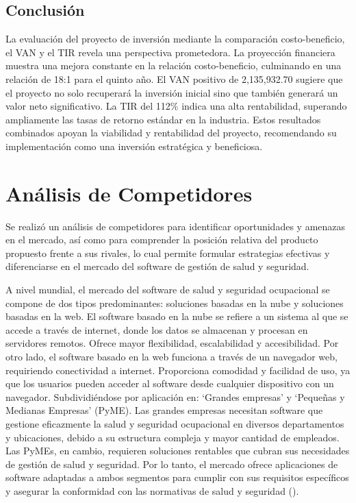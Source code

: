 \subsection{Conclusión}
La evaluación del proyecto de inversión mediante la comparación costo-beneficio, el VAN y el TIR revela una perspectiva prometedora. La proyección financiera muestra una mejora constante en la relación costo-beneficio, culminando en una relación de 18:1 para el quinto año. El VAN positivo de 2,135,932.70 sugiere que el proyecto no solo recuperará la inversión inicial sino que también generará un valor neto significativo. La TIR del 112\% indica una alta rentabilidad, superando ampliamente las tasas de retorno estándar en la industria. Estos resultados combinados apoyan la viabilidad y rentabilidad del proyecto, recomendando su implementación como una inversión estratégica y beneficiosa.

\section{Análisis de Competidores}

Se realizó un análisis de competidores para identificar oportunidades y amenazas en el mercado, así como para comprender la posición relativa del producto propuesto frente a sus rivales, lo cual permite formular estrategias efectivas y diferenciarse en el mercado del software de gestión de salud y seguridad. 

A nivel mundial, el mercado del software de salud y seguridad ocupacional se compone de dos tipos predominantes: soluciones basadas en la nube y soluciones basadas en la web. El software basado en la nube se refiere a un sistema al que se accede a través de internet, donde los datos se almacenan y procesan en servidores remotos. Ofrece mayor flexibilidad, escalabilidad y accesibilidad. Por otro lado, el software basado en la web funciona a través de un navegador web, requiriendo conectividad a internet. Proporciona comodidad y facilidad de uso, ya que los usuarios pueden acceder al software desde cualquier dispositivo con un navegador. Subdividiéndose por aplicación en: `Grandes empresas' y `Pequeñas y Medianas Empresas' (PyME). Las grandes empresas necesitan software que gestione eficazmente la salud y seguridad ocupacional en diversos departamentos y ubicaciones, debido a su estructura compleja y mayor cantidad de empleados. Las PyMEs, en cambio, requieren soluciones rentables que cubran sus necesidades de gestión de salud y seguridad. Por lo tanto, el mercado ofrece aplicaciones de software adaptadas a ambos segmentos para cumplir con sus requisitos específicos y asegurar la conformidad con las normativas de salud y seguridad (\cite{KingpinMarketResearch}).

